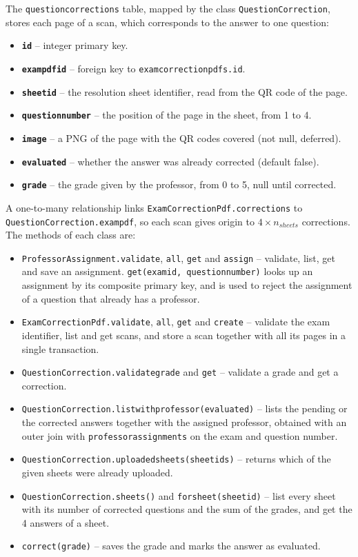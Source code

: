 \documentclass[letterpaper, 10 pt, conference]{ieeeconf}
\renewcommand{\_}{\textunderscore\allowbreak}
\begin{document}
The \texttt{question\_corrections} table, mapped by the class \texttt{QuestionCorrection}, stores each page of a scan, which corresponds to the answer to one question:
\begin{itemize}
    \item \textbf{\texttt{id}} -- integer primary key.
    \item \textbf{\texttt{exam\_pdf\_id}} -- foreign key to \texttt{exam\_correction\_pdfs.id}.
    \item \textbf{\texttt{sheet\_id}} -- the resolution sheet identifier, read from the QR code of the page.
    \item \textbf{\texttt{question\_number}} -- the position of the page in the sheet, from 1 to 4.
    \item \textbf{\texttt{image}} -- a PNG of the page with the QR codes covered (not null, deferred).
    \item \textbf{\texttt{evaluated}} -- whether the answer was already corrected (default false).
    \item \textbf{\texttt{grade}} -- the grade given by the professor, from 0 to 5, null until corrected.
\end{itemize}

A one-to-many relationship links \texttt{ExamCorrectionPdf.corrections} to \texttt{QuestionCorrection.exam\_pdf}, so each scan gives origin to $4 \times n_{sheets}$ corrections. The methods of each class are:
\begin{itemize}
    \item \texttt{ProfessorAssignment.validate}, \texttt{all}, \texttt{get} and \texttt{assign} -- validate, list, get and save an assignment. \texttt{get(exam\_id, question\_number)} looks up an assignment by its composite primary key, and is used to reject the assignment of a question that already has a professor.
    \item \texttt{ExamCorrectionPdf.validate}, \texttt{all}, \texttt{get} and \texttt{create} -- validate the exam identifier, list and get scans, and store a scan together with all its pages in a single transaction.
    \item \texttt{QuestionCorrection.validate\_grade} and \texttt{get} -- validate a grade and get a correction.
    \item \texttt{QuestionCorrection.list\_with\_professor(evaluated)} -- lists the pending or the corrected answers together with the assigned professor, obtained with an outer join with \texttt{professor\_assignments} on the exam and question number.
    \item \texttt{QuestionCorrection.uploaded\_sheets(sheet\_ids)} -- returns which of the given sheets were already uploaded.
    \item \texttt{QuestionCorrection.sheets()} and \texttt{for\_sheet(sheet\_id)} -- list every sheet with its number of corrected questions and the sum of the grades, and get the 4 answers of a sheet.
    \item \texttt{correct(grade)} -- saves the grade and marks the answer as evaluated.
\end{itemize}
\end{document}
